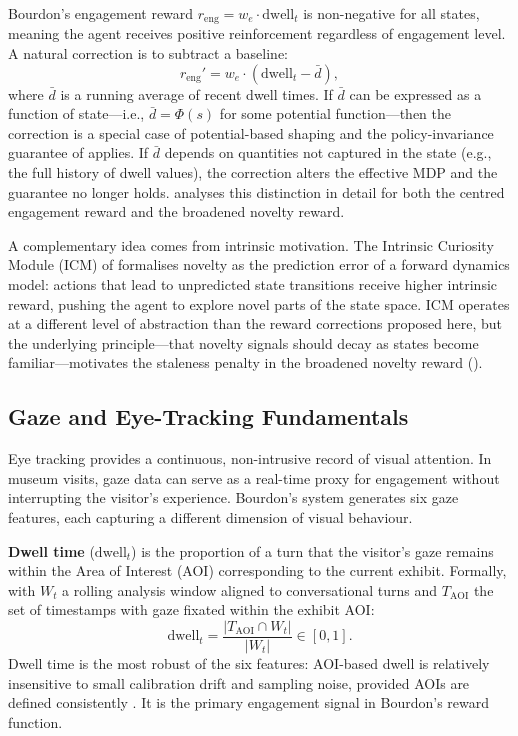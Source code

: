 \documentclass[a4paper, 11pt]{article}
\newcommand{\reng}{r_{\mathrm{eng}}}
\newcommand{\dwell}{\mathrm{dwell}_t}
\begin{document}
Bourdon's engagement reward $\reng = w_e \cdot \dwell$ is non-negative for all states, meaning the agent receives positive reinforcement regardless of engagement level. A natural correction is to subtract a baseline:
\begin{equation}
  \label{eq:centred_reward_bg}
  \reng' = w_e \cdot (\dwell - \bar{d}),
\end{equation}
where $\bar{d}$ is a running average of recent dwell times. If $\bar{d}$ can be expressed as a function of state---i.e., $\bar{d} = \Phi(s)$ for some potential function---then the correction is a special case of potential-based shaping and the policy-invariance guarantee of \citet{ng1999policy} applies. If $\bar{d}$ depends on quantities not captured in the state (e.g., the full history of dwell values), the correction alters the effective MDP and the guarantee no longer holds.  analyses this distinction in detail for both the centred engagement reward and the broadened novelty reward.

A complementary idea comes from intrinsic motivation. The Intrinsic Curiosity Module (ICM) of \citet{pathak2017curiosity} formalises novelty as the prediction error of a forward dynamics model: actions that lead to unpredicted state transitions receive higher intrinsic reward, pushing the agent to explore novel parts of the state space. ICM operates at a different level of abstraction than the reward corrections proposed here, but the underlying principle---that novelty signals should decay as states become familiar---motivates the staleness penalty in the broadened novelty reward ().

\subsection{Gaze and Eye-Tracking Fundamentals}
\label{sec:bg_gaze}

Eye tracking provides a continuous, non-intrusive record of visual attention. In museum visits, gaze data can serve as a real-time proxy for engagement without interrupting the visitor's experience. Bourdon's system generates six gaze features, each capturing a different dimension of visual behaviour.

\textbf{Dwell time} ($\dwell$) is the proportion of a turn that the visitor's gaze remains within the Area of Interest (AOI) corresponding to the current exhibit. Formally, with $W_t$ a rolling analysis window aligned to conversational turns and $T_{\mathrm{AOI}}$ the set of timestamps with gaze fixated within the exhibit AOI:
\begin{equation}
  \label{eq:dwell}
  \dwell = \frac{|T_{\mathrm{AOI}} \cap W_t|}{|W_t|} \in [0, 1].
\end{equation}
Dwell time is the most robust of the six features: AOI-based dwell is relatively insensitive to small calibration drift and sampling noise, provided AOIs are defined consistently \citep{bourdon2024thesis}. It is the primary engagement signal in Bourdon's reward function.
\end{document}
